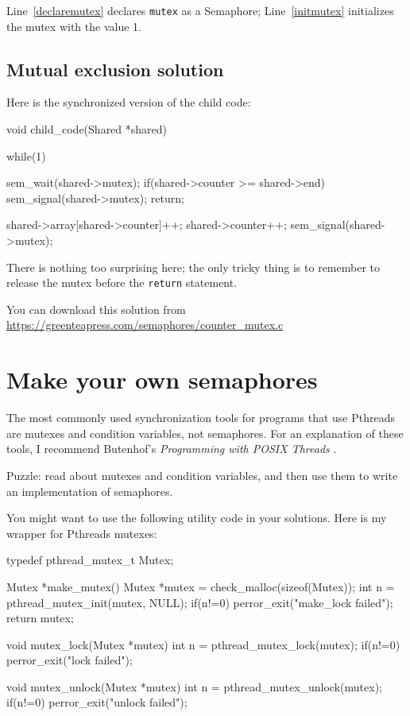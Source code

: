 \documentclass{book}
\begin{document}
Line~\ref{declaremutex} declares {\tt mutex} as a Semaphore;
Line~\ref{initmutex} initializes the mutex with the value 1.



\subsection{Mutual exclusion solution}

Here is the synchronized version of the child code:

\begin{unbreakable}[]{}
void child_code(Shared *shared)
{
  while(1) {
    sem_wait(shared->mutex);
    if(shared->counter >= shared->end) {
      sem_signal(shared->mutex);
      return;
    }

    shared->array[shared->counter]++;
    shared->counter++;
    sem_signal(shared->mutex);
  }
}
\end{unbreakable}

There is nothing too surprising here; the only tricky thing
is to remember to release the mutex before the {\tt return}
statement.

You can download this solution from
\url{https://greenteapress.com/semaphores/counter_mutex.c}



\section{Make your own semaphores}
\label{makeyourown}

The most commonly used synchronization tools for programs that use
Pthreads are mutexes and condition variables, not semaphores.  For an
explanation of these tools, I recommend Butenhof's {\em Programming
with POSIX Threads} \cite{butenhof}.

Puzzle: read about mutexes and condition variables, and then
use them to write an implementation of semaphores.

You might want to use the following utility code in your solutions.
Here is my wrapper for Pthreads mutexes:

\begin{unbreakable}[]{}
typedef pthread_mutex_t Mutex;

Mutex *make_mutex() {
 Mutex *mutex = 
 check_malloc(sizeof(Mutex));
 int n = pthread_mutex_init(mutex, NULL);
 if(n!=0) perror_exit("make_lock failed"); 
 return mutex;
}

void mutex_lock(Mutex *mutex) {
 int n = pthread_mutex_lock(mutex);
 if(n!=0) perror_exit("lock failed");
}

void mutex_unlock(Mutex *mutex) {
 int n = pthread_mutex_unlock(mutex);
 if(n!=0) perror_exit("unlock failed");
}
\end{unbreakable}
\end{document}
